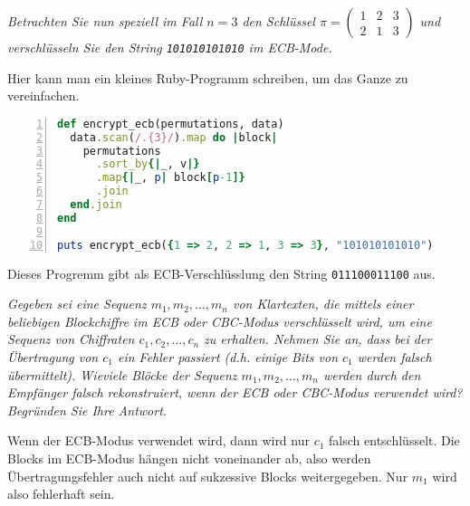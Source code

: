 \documentclass[
  ngerman,
  DIV=12
]{scrartcl}
\begin{document}
\bigskip\noindent
\emph{Betrachten Sie nun speziell im Fall $n = 3$ den Schlüssel $\pi = \begin{pmatrix}1&2&3\\2&1&3\end{pmatrix}$ und verschlüsseln Sie den String \texttt{101010101010} im ECB-Mode.}

\medskip\noindent
Hier kann man ein kleines Ruby-Programm schreiben, um das Ganze zu vereinfachen.
\begin{lstlisting}[language=ruby,numbers=left]
def encrypt_ecb(permutations, data)
  data.scan(/.{3}/).map do |block|
    permutations
      .sort_by{|_, v|}
      .map{|_, p| block[p-1]}
      .join
  end.join
end

puts encrypt_ecb({1 => 2, 2 => 1, 3 => 3}, "101010101010")
\end{lstlisting}
Dieses Progremm gibt als ECB-Verschlüsslung den String \verb|011100011100| aus.

\bigskip\noindent
\emph{Gegeben sei eine Sequenz $m_1, m_2, \dots, m_n$ von Klartexten, die mittels einer beliebigen Blockchiffre im ECB oder CBC-Modus verschlüsselt wird, um eine Sequenz von Chiffraten $c_1, c_2, \dots, c_n$ zu erhalten. Nehmen Sie an, dass bei der Übertragung von $c_1$ ein Fehler passiert (d.h. einige Bits von $c_1$ werden falsch übermittelt). Wieviele Blöcke der Sequenz $m_1, m_2, \dots , m_n$ werden durch den Empfänger falsch rekonstruiert, wenn der ECB oder CBC-Modus verwendet wird? Begründen Sie Ihre Antwort.}

\medskip\noindent
Wenn der ECB-Modus verwendet wird, dann wird nur $c_1$ falsch entschlüsselt. Die Blocks im ECB-Modus hängen nicht voneinander ab, also werden Übertragungsfehler auch nicht auf sukzessive Blocks weitergegeben. Nur $m_1$ wird also fehlerhaft sein. 
\end{document}
